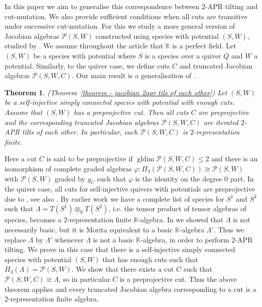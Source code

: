 \documentclass[a4paper, reqno]{amsart}
\newtheorem*{mythm*}{Theorem}
\theoremstyle{definition}
\newcommand{\K}{\mathbb{K}}
\DeclareMathOperator{\gldim}{\mathrm{gldim}}
\begin{document}
In this paper we aim to generalise this correspondence between $2$-APR tilting and cut-mutation. We also provide sufficient conditions when all cuts are transitive under successive cut-mutation. For this we study a more general version of Jacobian algebras $\mathcal{P}(S, W)$ constructed using species with potential $(S, W)$, studied by \cite{Nquefack2012PotentialsJacobian}. We assume throughout the article that $\K$ is a perfect field. Let $(S, W)$ be a species with potential where $S$ is a species over a quiver $Q$ and $W$ a potential. Similarly, to the quiver case, we define cuts $C$ and truncated Jacobian algebras $\mathcal{P}(S, W, C)$. Our main result is a generalisation of \cite[Theorem 8.7]{HerschendOsamu2011quiverwithpotential}.

\begin{mythm*}(Theorem~\ref{theorem - jacobian 2apr tils of each other})
	Let $(S, W)$ be a self-injective simply connected species with potential with enough cuts. Assume that $(S, W)$ has a preprojective cut. Then all cuts $C$ are preprojective and the corresponding truncated Jacobian algebras $\mathcal{P}(S, W, C)$ are iterated $2$-APR tilts of each other. In particular, each $\mathcal{P}(S, W, C)$ is $2$-representation finite.
\end{mythm*}

Here a cut $C$ is said to be preprojective if $\gldim \mathcal{P}(S, W, C)\le 2$ and there is an isomorphism of complete graded algebras $\varphi: \Pi_3(\mathcal{P}(S, W, C)) \cong \mathcal{P}(S, W)$ with $\mathcal{P}(S, W)$ graded by $g_C$ such that $\varphi$ is the identity on the degree $0$ part. In the quiver case, all cuts for self-injective quivers with potentials are preprojective due to \cite{Keller2011CYcompletions}, see also \cite[Proposition 3.9]{HerschendOsamu2011quiverwithpotential}. By earlier work \cite{soderberg2022preprojective} we have a complete list of species for $S^1$ and $S^2$ such that $\Lambda=T(S^1)\otimes_\K T(S^2)$, i.e. the tensor product of tensor algebras of species, becomes a $2$-representation finite $\K$-algebra. In \cite{soderberg2024mutation} we showed that $\Lambda$ is not necessarily basic, but it is Morita equivalent to a basic $\K$-algebra $\Lambda'$. Thus we replace $\Lambda$ by $\Lambda'$ whenever $\Lambda$ is not a basic $\K$-algebra, in order to perform $2$-APR tilting. We prove in this case that there is a self-injective simply connected species with potential $(S, W)$ that has enough cuts such that $\Pi_3(\Lambda) = \mathcal{P}(S, W)$. We show that there exists a cut $C$ such that $\mathcal{P}(S, W, C)\cong \Lambda$, so in particular $C$ is a preprojective cut. Thus the above theorem applies and every truncated Jacobian algebra corresponding to a cut is a $2$-representation finite algebra.
\end{document}
